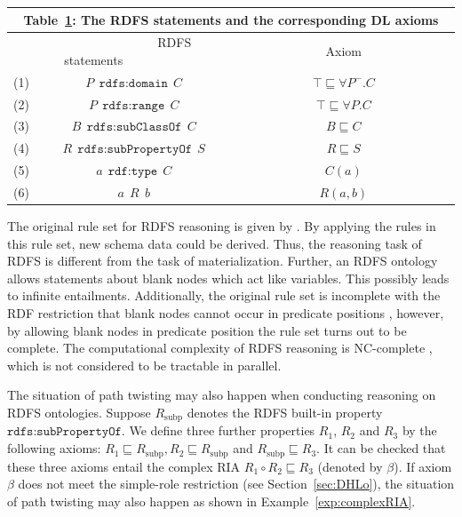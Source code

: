\begin{table}
\begin{center}
\begin{tabular}{lcc}
\multicolumn{3}{c}{\textbf{Table~\ref{tab:rdfs}: The RDFS statements and the corresponding DL axioms}}\\
\hline
&~~~~~~~~~~~~~RDFS statements~~~~~~~~~~~~~&~~~~~~~~~~~~~~Axiom~~~~~~~~~~~~~~\\
\hline
\hline
(1)&$P~~\texttt{rdfs:domain}~~C$& $\top\sqsubseteq\forall P^-.C$\\

(2)&$P~~\texttt{rdfs:range}~~C$& $\top\sqsubseteq\forall P.C$\\

(3)&$B~~\texttt{rdfs:subClassOf}~~C$& $B\sqsubseteq C$\\

(4)&$R~~\texttt{rdfs:subPropertyOf}~~S$& $R\sqsubseteq S$\\
\hline
(5)&$a~~\texttt{rdf:type}~~C$& $C(a)$\\

(6)&$a~~R~~b$& $R(a,b)$\\
\hline
\end{tabular}
\label{tab:rdfs}
\end{center}
\end{table}


The original rule set for RDFS reasoning is
given by \citet{RDFSrec04}. By applying the rules in this rule set,
new schema data could be derived. Thus, the reasoning task of RDFS
is different from the task of materialization. Further, an RDFS ontology allows
statements about blank nodes which act like variables. This possibly
leads to infinite entailments. Additionally, the original rule set is
incomplete with the RDF restriction that
blank nodes cannot occur in predicate positions \cite{Horst05},
however, by allowing blank nodes in predicate position
the rule set turns out to be complete. The computational complexity
of RDFS reasoning is NC-complete \cite{Horst05},
which is not considered to be tractable in parallel.

The situation of path twisting may also happen when conducting reasoning
on RDFS ontologies. Suppose $R_{\text{subp}}$ denotes the RDFS built-in property $\texttt{rdfs:subPropertyOf}$.
We define three further properties $R_1$, $R_2$ and $R_3$ by the following axioms:
$R_1\sqsubseteq R_{\text{subp}}, R_2\sqsubseteq R_{\text{subp}}$ and $R_{\text{subp}}\sqsubseteq R_3$.
It can be checked that these three axioms entail the complex RIA $R_1\circ R_2\sqsubseteq R_3$ (denoted by $\beta$).
If axiom $\beta$ does not meet the simple-role restriction (see Section~\ref{sec:DHLo}),
the situation of path twisting may also happen as shown in Example~\ref{exp:complexRIA}.

